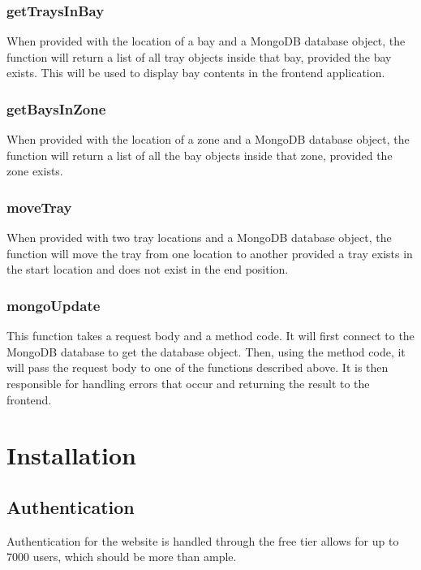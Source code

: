 \documentclass[letterpaper,10pt,english]{sphinxmanual}
\begin{document}
\subsection{getTraysInBay}
\label{\detokenize{docs/Introduction/Backend_overview:gettraysinbay}}
When provided with the location of a bay and a MongoDB database object,
the function will return a list of all tray objects inside that bay,
provided the bay exists. This will be used to display bay contents in
the front\sphinxhyphen{}end application.


\subsection{getBaysInZone}
\label{\detokenize{docs/Introduction/Backend_overview:getbaysinzone}}
When provided with the location of a zone and a MongoDB database object,
the function will return a list of all the bay objects inside that zone,
provided the zone exists.


\subsection{moveTray}
\label{\detokenize{docs/Introduction/Backend_overview:movetray}}
When provided with two tray locations and a MongoDB database object, the
function will move the tray from one location to another provided a tray
exists in the start location and does not exist in the end position.


\subsection{mongoUpdate}
\label{\detokenize{docs/Introduction/Backend_overview:mongoupdate}}
This function takes a request body and a method code. It will first
connect to the MongoDB database to get the database object. Then, using
the method code, it will pass the request body to one of the functions
described above. It is then responsible for handling errors that occur
and returning the result to the front\sphinxhyphen{}end.


\chapter{Installation}
\label{\detokenize{index:installation}}

\section{Authentication}
\label{\detokenize{docs/Installation/authentication:authentication}}\label{\detokenize{docs/Installation/authentication::doc}}
Authentication for the website is handled through
 the free tier allows for up to 7000
users, which should be more than ample.
\end{document}
